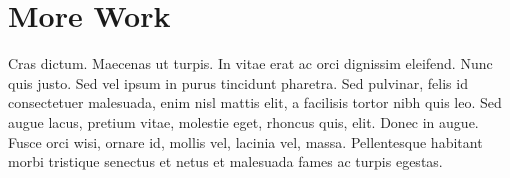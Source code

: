 \documentclass[oneside]{umnStatThesis}
\begin{document}
\section{More Work}

Cras dictum. Maecenas ut turpis. In vitae erat ac orci dignissim eleifend. Nunc quis justo. Sed vel ipsum in purus tincidunt pharetra. Sed pulvinar, felis id consectetuer malesuada, enim nisl mattis elit, a facilisis tortor nibh quis leo. Sed augue lacus, pretium vitae, molestie eget, rhoncus quis, elit. Donec in augue. Fusce orci wisi, ornare id, mollis vel, lacinia vel, massa. Pellentesque habitant morbi tristique senectus et netus et malesuada fames ac turpis egestas.



\end{document}

